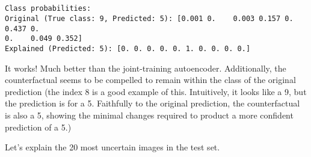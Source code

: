 \documentclass[11pt]{article}
\begin{document}
    \begin{center}
    \end{center}
    { \hspace*{\fill} \\}
    
    \begin{Verbatim}[commandchars=\\\{\}]

Class probabilities:
Original (True class: 9, Predicted: 5): [0.001 0.    0.003 0.157 0.    0.437 0.
0.    0.049 0.352]
Explained (Predicted: 5): [0. 0. 0. 0. 0. 1. 0. 0. 0. 0.]
    \end{Verbatim}

    It works! Much better than the joint-training autoencoder. Additionally,
the counterfactual seems to be compelled to remain within the class of
the original prediction (the index 8 is a good example of this.
Intuitively, it looks like a 9, but the prediction is for a 5.
Faithfully to the original prediction, the counterfactual is also a 5,
showing the minimal changes required to product a more confident
prediction of a 5.)

    Let's explain the 20 most uncertain images in the test set.
\end{document}
